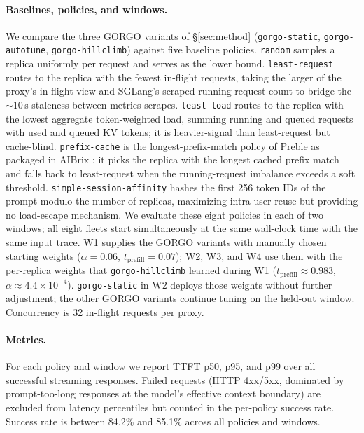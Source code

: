 \documentclass{article}
\begin{document}
\paragraph{Baselines, policies, and windows.}
We compare the three GORGO variants of \S\ref{sec:method}
(\texttt{gorgo-static}, \texttt{gorgo-autotune}, \texttt{gorgo-hillclimb})
against five baseline policies. \texttt{random} samples a replica uniformly per
request and serves as the lower bound. \texttt{least-request} routes to the
replica with the fewest in-flight requests, taking the larger of the proxy's
in-flight view and SGLang's scraped running-request count to bridge the
$\sim$10\,s staleness between metrics scrapes. \texttt{least-load} routes to the
replica with the lowest aggregate token-weighted load, summing running and
queued requests with used and queued KV tokens; it is heavier-signal than
least-request but cache-blind. \texttt{prefix-cache} is the longest-prefix-match policy of Preble
\citep{preble} as packaged in AIBrix \citep{aibrix2024}: it picks the replica
with the longest cached prefix match and falls back to least-request when the
running-request imbalance exceeds a soft threshold. \texttt{simple-session-affinity}
hashes the first 256 token IDs of the prompt modulo the number of replicas,
maximizing intra-user reuse but providing no load-escape mechanism. We evaluate
these eight policies in each of two windows; all eight fleets start
simultaneously at the same wall-clock time with the same input trace. W1 supplies the GORGO variants with manually chosen starting weights ($\alpha=0.06$,
$t_{\mathrm{prefill}}=0.07$); W2, W3, and W4 use them with the per-replica weights that
\texttt{gorgo-hillclimb} learned during W1 ($t_{\mathrm{prefill}}\approx 0.983$,
$\alpha\approx 4.4\times10^{-4}$). \texttt{gorgo-static} in W2 deploys those
weights without further adjustment; the other GORGO variants continue tuning on
the held-out window. Concurrency is 32 in-flight requests per proxy.

\paragraph{Metrics.}
For each policy and window we report TTFT p50, p95, and p99 over all successful
streaming responses. Failed requests (HTTP 4xx/5xx, dominated by prompt-too-long
responses at the model's effective context boundary) are excluded from latency
percentiles but counted in the per-policy success rate. Success rate is between
84.2\% and 85.1\% across all policies and windows.
\end{document}
